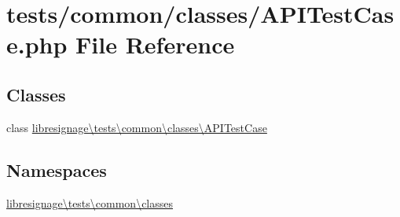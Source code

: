 \hypertarget{APITestCase_8php}{}\section{tests/common/classes/\+A\+P\+I\+Test\+Case.php File Reference}
\label{APITestCase_8php}
\subsection*{Classes}
\begin{DoxyCompactItemize}
\item 
class \hyperlink{classlibresignage_1_1tests_1_1common_1_1classes_1_1APITestCase}{libresignage\textbackslash{}tests\textbackslash{}common\textbackslash{}classes\textbackslash{}\+A\+P\+I\+Test\+Case}
\end{DoxyCompactItemize}
\subsection*{Namespaces}
\begin{DoxyCompactItemize}
\item 
 \hyperlink{namespacelibresignage_1_1tests_1_1common_1_1classes}{libresignage\textbackslash{}tests\textbackslash{}common\textbackslash{}classes}
\end{DoxyCompactItemize}
